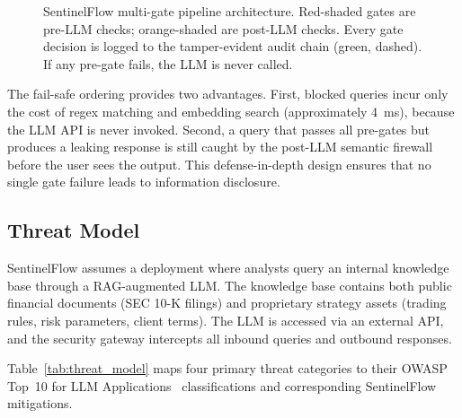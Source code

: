 \documentclass[journal,12pt,onecolumn,draftclsnofoot]{IEEEtran}
\begin{document}
\begin{figure}[!ht]
\caption{SentinelFlow multi-gate pipeline architecture. Red-shaded gates are pre-LLM checks; orange-shaded are post-LLM checks. Every gate decision is logged to the tamper-evident audit chain (green, dashed). If any pre-gate fails, the LLM is never called.}
\label{fig:architecture}
\end{figure}

The fail-safe ordering provides two advantages. First, blocked queries incur only the cost of regex matching and embedding search (approximately 4~ms), because the LLM API is never invoked. Second, a query that passes all pre-gates but produces a leaking response is still caught by the post-LLM semantic firewall before the user sees the output. This defense-in-depth design ensures that no single gate failure leads to information disclosure.

\subsection{Threat Model}
\label{Sect:Threat_Model}

SentinelFlow assumes a deployment where analysts query an internal knowledge base through a RAG-augmented LLM. The knowledge base contains both public financial documents (SEC 10-K filings) and proprietary strategy assets (trading rules, risk parameters, client terms). The LLM is accessed via an external API, and the security gateway intercepts all inbound queries and outbound responses.

Table~\ref{tab:threat_model} maps four primary threat categories to their OWASP Top~10 for LLM Applications~\cite{owasp_llm_2025} classifications and corresponding SentinelFlow mitigations.
\end{document}
